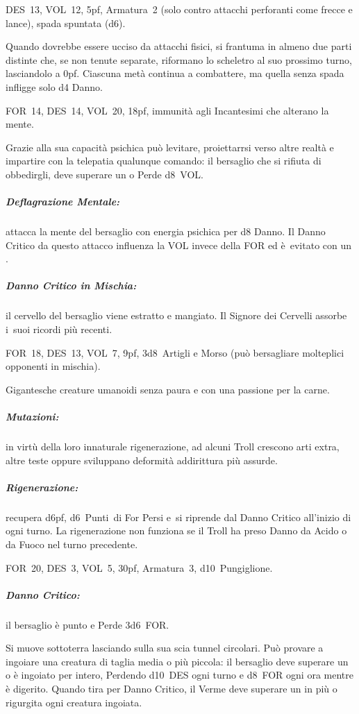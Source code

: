 \documentclass[itdr]{subfiles}
\begin{document}
\vfill

DES~13, VOL~12, 5pf, Armatura~2 (solo contro attacchi perforanti come frecce e lance), spada spuntata (d6).

Quando dovrebbe essere ucciso da attacchi fisici, si frantuma in almeno due parti distinte che, se non tenute separate, riformano lo scheletro al suo prossimo turno, lasciandolo a 0pf. Ciascuna metà continua a combattere, ma quella senza spada infligge solo d4 Danno.

\vfill

FOR~14, DES~14, VOL~20, 18pf, immunità agli Incantesimi che alterano la mente.

Grazie alla sua capacità psichica può levitare, proiettarrsi verso altre realtà e impartire con la telepatia qualunque comando: il bersaglio che si rifiuta di obbedirgli, deve superare un  o Perde d8~VOL.

\subparagraph{Deflagrazione Mentale:} attacca la mente del bersaglio con energia psichica per d8 Danno. Il Danno Critico da questo attacco influenza la VOL invece della FOR ed è~evitato con un .

\subparagraph{Danno Critico in Mischia:} il cervello del bersaglio viene estratto e mangiato. Il Signore dei Cervelli assorbe i~suoi ricordi più recenti.

\vfill

FOR~18, DES~13, VOL~7, 9pf, 3d8~Artigli e Morso (può bersagliare molteplici opponenti in mischia).

Gigantesche creature umanoidi senza paura e con una passione per la carne.

\subparagraph{Mutazioni:} in virtù della loro innaturale rigenerazione, ad alcuni Troll crescono arti extra, altre teste oppure sviluppano deformità addirittura più assurde.

\subparagraph{Rigenerazione:} recupera d6pf, d6~Punti~di For Persi e~si riprende dal Danno Critico all'inizio di ogni turno. La rigenerazione non funziona se il Troll ha preso Danno da Acido o da Fuoco nel turno precedente.

\break


FOR~20, DES~3, VOL~5, 30pf, Armatura~3, d10~Pungiglione.

\subparagraph{Danno Critico:} il bersaglio è punto e Perde 3d6~FOR.

Si muove sottoterra lasciando sulla sua scia tunnel circolari. Può provare a ingoiare una creatura di taglia media o più piccola: il bersaglio deve superare un  o è ingoiato per intero, Perdendo d10~DES ogni turno e d8~FOR ogni ora mentre è digerito. Quando tira per Danno Critico, il Verme deve superare un  in più o rigurgita ogni creatura ingoiata.
\end{document}
